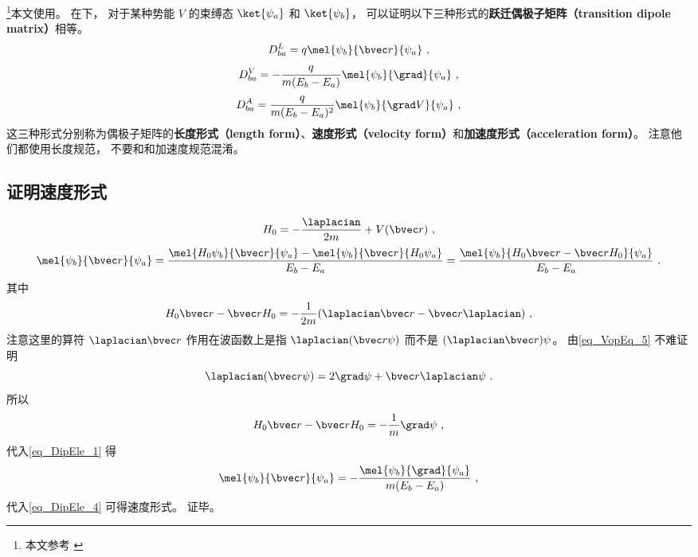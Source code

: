 

\footnote{本文参考 \cite{Bransden}}本文使用。 在下， 对于某种势能 $V$ 的束缚态 $\ket{\psi_a}$ 和 $\ket{\psi_b}$， 可以证明以下三种形式的\textbf{跃迁偶极子矩阵（transition dipole matrix）}相等。
\begin{equation}\label{eq_DipEle_4}
D_{ba}^L = q\mel{\psi_b}{\bvec r}{\psi_a}~,
\end{equation}
\begin{equation}\label{eq_DipEle_3}
D_{ba}^V = -\frac{q}{m(E_b - E_a)}\mel{\psi_b}{\grad}{\psi_a}~,
\end{equation}
\begin{equation}
D_{ba}^A = \frac{q}{m(E_b-E_a)^2} \mel{\psi_b}{\grad V}{\psi_a}~,
\end{equation}
这三种形式分别称为偶极子矩阵的\textbf{长度形式（length form）}、\textbf{速度形式（velocity form）}和\textbf{加速度形式（acceleration form）}。 注意他们都使用长度规范， 不要和和加速度规范混淆。 %

\subsection{证明速度形式}
\begin{equation}
H_0 = -\frac{\laplacian}{2m} + V(\bvec r)~,
\end{equation}
\begin{equation}\label{eq_DipEle_1}
\mel{\psi_b}{\bvec r}{\psi_a} = \frac{\mel{H_0\psi_b}{\bvec r}{\psi_a} - \mel{\psi_b}{\bvec r}{H_0\psi_a}}{E_b - E_a} = \frac{\mel{\psi_b}{H_0\bvec r - \bvec rH_0}{\psi_a}}{E_b - E_a}~.
\end{equation}
其中
\begin{equation}
H_0\bvec r - \bvec rH_0 = -\frac{1}{2m}(\laplacian \bvec r - \bvec r \laplacian)~,
\end{equation}
注意这里的算符 $\laplacian \bvec r$ 作用在波函数上是指 $\laplacian (\bvec r \psi)$ 而不是 $(\laplacian \bvec r) \psi$。 由\autoref{eq_VopEq_5}  不难证明
\begin{equation}
\laplacian (\bvec r \psi) = 2 \grad \psi + \bvec r \laplacian \psi~.
\end{equation}
所以
\begin{equation}
H_0\bvec r - \bvec rH_0 = -\frac{1}{m}\grad \psi~,
\end{equation}
代入\autoref{eq_DipEle_1} 得
\begin{equation}
\mel{\psi_b}{\bvec r}{\psi_a} = -\frac{\mel{\psi_b}{\grad}{\psi_a}}{m(E_b - E_a)}~,
\end{equation}
代入\autoref{eq_DipEle_4} 可得速度形式。 证毕。

